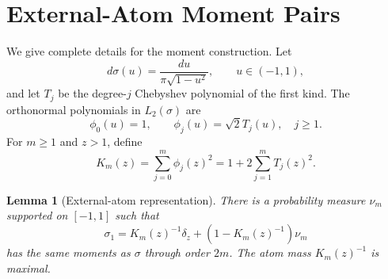 \documentclass[twoside]{article}
\newtheorem{lemma}[theorem]{Lemma}
\newcommand{\1}{\mathbf 1}
\begin{document}
\runningauthor{}

\onecolumn
{}



\appendix

\section{External-Atom Moment Pairs}
\label{app:moment}

We give complete details for the moment construction. Let
\[
 d\sigma(u)=\frac{du}{\pi\sqrt{1-u^2}},\qquad u\in(-1,1),
\]
and let $T_j$ be the degree-$j$ Chebyshev polynomial of the first kind. The
orthonormal polynomials in $L_2(\sigma)$ are
\[
 \phi_0(u)=1,\qquad \phi_j(u)=\sqrt2T_j(u),\quad j\ge1.
\]
For $m\ge1$ and $z>1$, define
\[
 K_m(z)=\sum_{j=0}^m\phi_j(z)^2
 =1+2\sum_{j=1}^mT_j(z)^2.
\]

\begin{lemma}[External-atom representation]
\label{lem:app-moment}
There is a probability measure $\nu_m$ supported on $[-1,1]$ such that
\[
 \sigma_1=K_m(z)^{-1}\delta_z+
 (1-K_m(z)^{-1})\nu_m
\]
has the same moments as $\sigma$ through order $2m$. The atom mass
$K_m(z)^{-1}$ is maximal.
\end{lemma}
\end{document}
